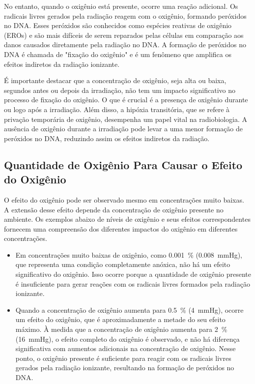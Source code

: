 \documentclass[11pt,a4paper]{article}
\newcounter{exemplo}
\begin{document}
	No entanto, quando o oxigênio está presente, ocorre uma reação adicional. Os radicais livres gerados pela radiação reagem com o oxigênio, formando peróxidos no DNA. Esses peróxidos são conhecidos como espécies reativas de oxigênio (EROs) e são mais difíceis de serem reparados pelas células em comparação aos danos causados diretamente pela radiação no DNA. A formação de peróxidos no DNA é chamada de "fixação do oxigênio" e é um fenômeno que amplifica os efeitos indiretos da radiação ionizante.

	É importante destacar que a concentração de oxigênio, seja alta ou baixa, segundos antes ou depois da irradiação, não tem um impacto significativo no processo de fixação do oxigênio. O que é crucial é a presença de oxigênio durante ou logo após a irradiação. Além disso, a hipóxia transitória, que se refere à privação temporária de oxigênio, desempenha um papel vital na radiobiologia. A ausência de oxigênio durante a irradiação pode levar a uma menor formação de peróxidos no DNA, reduzindo assim os efeitos indiretos da radiação.

\subsection*{Quantidade de Oxigênio Para Causar o Efeito do Oxigênio}

	O efeito do oxigênio pode ser observado mesmo em concentrações muito baixas. A extensão desse efeito depende da concentração de oxigênio presente no ambiente. Os exemplos abaixo de níveis de oxigênio e seus efeitos correspondentes fornecem uma compreensão dos diferentes impactos do oxigênio em diferentes concentrações.

	\begin{exemplo}
		\begin{itemize}[label=\textcolor{CarnationPink}{$\blacktriangleright$}]
			\item Em concentrações muito baixas de oxigênio, como \SI{0.001}{\percent} (\SI{0.008}{\mmHg}), que representa uma condição completamente anóxica, não há um efeito significativo do oxigênio. Isso ocorre porque a quantidade de oxigênio presente é insuficiente para gerar reações com os radicais livres formados pela radiação ionizante.

			\item  Quando a concentração de oxigênio aumenta para \SI{0.5}{\percent} (\SI{4}{\mmHg}), ocorre um efeito do oxigênio, que é aproximadamente a metade do seu efeito máximo. À medida que a concentração de oxigênio aumenta para \SI{2}{\percent} (\SI{16}{\mmHg}), o efeito completo do oxigênio é observado, e não há diferença significativa com aumentos adicionais na concentração de oxigênio. Nesse ponto, o oxigênio presente é suficiente para reagir com os radicais livres gerados pela radiação ionizante, resultando na formação de peróxidos no DNA.
		\end{itemize}
	\end{exemplo}
	
\end{document}
